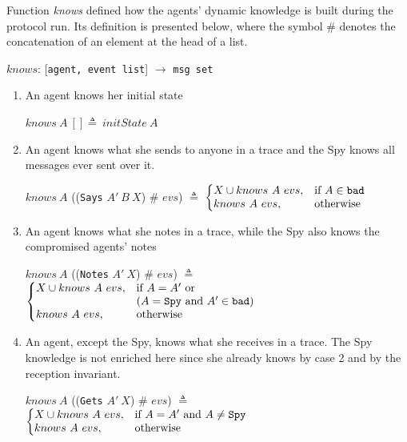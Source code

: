 Function \textit{knows} defined how the agents' dynamic knowledge is built during the protocol run. Its definition is presented below, where the symbol \#  denotes the concatenation of an element at the head of a list.
%
\begin{center}
  \(knows\): [\texttt{agent, event list}] \(\longrightarrow \) \texttt{msg set}
\end{center}
%
\begin{enumerate}
  \item An agent knows her initial state
  \begin{center}
    \(knows\ A\ [] \triangleq\ initState\ A\)
  \end{center}
  \item An agent knows what she sends to anyone in a trace and the Spy knows all messages ever sent over it.
  \begin{center}
    \(knows\ A\) ((\texttt{Says} \(A'\ B \ X\)) \# \(evs\)) \(\triangleq \)
    \(\left \{
      \begin{array}{@{}ll@{}}
        {X} \cup knows\ A\ evs, & \text{if } A \in \texttt{bad} \\
        knows\ A\ evs, & \text{otherwise}
      \end{array} \right.\)
  \end{center}
  \item An agent knows what she notes in a trace, while the Spy also knows the compromised agents' notes
  \begin{center}
    \(knows\ A\) ((\texttt{Notes} \(A'\ X\)) \# \(evs\)) \(\triangleq \)
    \(\left \{
      \begin{array}{@{}ll@{}}
        {X} \cup knows\ A\ evs, & \text{if } A = A' \text{ or } \\ & (A = \texttt{Spy} \text{ and } A' \in \texttt{bad}) \\
        knows\ A\ evs, & \text{otherwise}
      \end{array} \right.\)
  \end{center}
  \item An agent, except the Spy, knows what she receives in a trace. The Spy knowledge is not enriched here since she already knows by case 2 and by the reception invariant.
  \begin{center}
    \(knows\ A\) ((\texttt{Gets} \(A'\ X\)) \# \(evs\)) \(\triangleq \)
    \(\left \{
      \begin{array}{@{}ll@{}}
        {X} \cup knows\ A\ evs, & \text{if } A = A' \text{ and } A \neq \texttt{Spy} \\
        knows\ A\ evs, & \text{otherwise}
      \end{array} \right.\)
  \end{center}
\end{enumerate}

